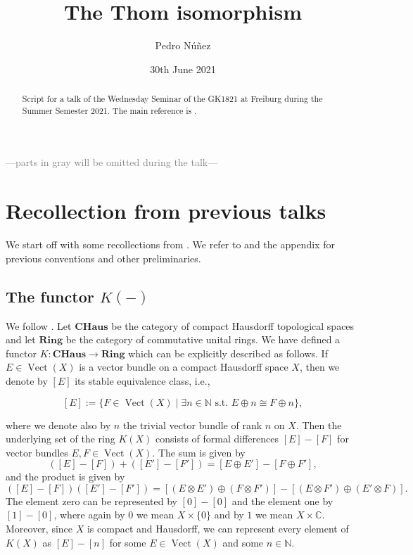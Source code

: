 \documentclass[12pt,a4paper]{amsart}
\title[The Thom isomorphism]{The Thom isomorphism}
\author[Pedro N\'{u}\~{n}ez]{Pedro N\'{u}\~{n}ez}
\date{30th June 2021}
\theoremstyle{plain}
\theoremstyle{definition}
\theoremstyle{remark}
\begin{document}
\maketitle

\begin{abstract}
  Script for a talk of the Wednesday Seminar of the GK1821 at Freiburg during the Summer Semester 2021.
  The main reference is \cite[\S 2]{ati67}.
\end{abstract}

\tableofcontents

\begin{center}
  \textcolor{gray}{---parts in gray will be omitted during the talk---}
\end{center}

\section{Recollection from previous talks}

We start off with some recollections from \cite[\S 2]{ati67}.
We refer to \cite{ati67} and the appendix for previous conventions and other preliminaries.

\subsection{The functor $K(-)$}
We follow \cite[p.~44]{ati67}.
Let $\mathbf{CHaus}$ be the category of compact Hausdorff topological spaces and let $\mathbf{Ring}$ be the category of commutative unital rings.
We have defined a functor $K \colon \mathbf{CHaus} \to \mathbf{Ring}$ which can be explicitly described as follows.
If $E \in \operatorname{Vect}(X)$ is a vector bundle on a compact Hausdorff space $X$, then we denote by $[E]$ its stable equivalence class, i.e.,

\[ [E] := \{ F \in \operatorname{Vect}(X) \mid \exists n \in \mathbb{N} \text{ s.t.~} E \oplus n \cong F \oplus n \}, \]

where we denote also by $n$ the trivial vector bundle of rank $n$ on $X$.
Then the underlying set of the ring $K(X)$ consists of formal differences $[E] - [F]$ for vector bundles $E, F \in \operatorname{Vect}(X)$.
The sum is given by
\[ ([E] - [F]) + ([E'] - [F']) = [E \oplus E'] - [F \oplus F'], \]
and the product is given by
\[ ([E] - [F]) ([E'] - [F']) = [(E \otimes E') \oplus (F \otimes F')] - [(E \otimes F') \oplus (E' \otimes F)]. \]
The element zero can be represented by $[0] - [0]$ and the element one by $[1] - [0]$, where again by $0$ we mean $X \times \{0\}$ and by $1$ we mean $X \times \mathbb{C}$.
Moreover, since $X$ is compact and Hausdorff, we can represent every element of $K(X)$ as $[E] - [n]$ for some $E \in \operatorname{Vect}(X)$ and some $n \in \mathbb{N}$.
\end{document}
